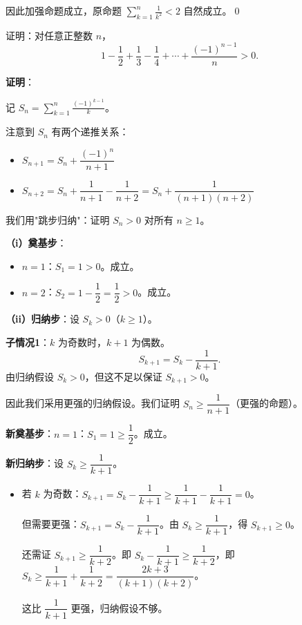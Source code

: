 \documentclass[12pt, a4paper]{ctexart}
\begin{document}
因此加强命题成立，原命题 $\displaystyle\sum_{k=1}^{n}\frac{1}{k^2} < 2$ 自然成立。\qed

\begin{examplebox}[【例题11】跳步归纳法]
证明：对任意正整数 $n$，
\[ 1 - \frac{1}{2} + \frac{1}{3} - \frac{1}{4} + \cdots + \frac{(-1)^{n-1}}{n} > 0. \]
\end{examplebox}

\textbf{证明}：

记 $S_n = \displaystyle\sum_{k=1}^{n}\frac{(-1)^{k-1}}{k}$。

注意到 $S_n$ 有两个递推关系：
\begin{itemize}
  \item $S_{n+1} = S_n + \dfrac{(-1)^n}{n+1}$
  \item $S_{n+2} = S_n + \dfrac{1}{n+1} - \dfrac{1}{n+2} = S_n + \dfrac{1}{(n+1)(n+2)}$
\end{itemize}

我们用"跳步归纳"：证明 $S_n > 0$ 对所有 $n \geq 1$。

\textbf{（i）奠基步}：
\begin{itemize}
  \item $n=1$：$S_1 = 1 > 0$。成立。
  \item $n=2$：$S_2 = 1 - \dfrac{1}{2} = \dfrac{1}{2} > 0$。成立。
\end{itemize}

\textbf{（ii）归纳步}：设 $S_k > 0$（$k \geq 1$）。

\textbf{子情况1}：$k$ 为奇数时，$k+1$ 为偶数。
\[ S_{k+1} = S_k - \frac{1}{k+1}. \]
由归纳假设 $S_k > 0$，但这不足以保证 $S_{k+1} > 0$。

因此我们采用更强的归纳假设。我们证明 $S_n \geq \dfrac{1}{n+1}$（更强的命题）。

\textbf{新奠基步}：$n=1$：$S_1 = 1 \geq \dfrac{1}{2}$。成立。

\textbf{新归纳步}：设 $S_k \geq \dfrac{1}{k+1}$。

\begin{itemize}
  \item 若 $k$ 为奇数：$S_{k+1} = S_k - \dfrac{1}{k+1} \geq \dfrac{1}{k+1} - \dfrac{1}{k+1} = 0$。

  但需要更强：$S_{k+1} = S_k - \dfrac{1}{k+1}$。由 $S_k \geq \dfrac{1}{k+1}$，得 $S_{k+1} \geq 0$。

  还需证 $S_{k+1} \geq \dfrac{1}{k+2}$。即 $S_k - \dfrac{1}{k+1} \geq \dfrac{1}{k+2}$，即 $S_k \geq \dfrac{1}{k+1} + \dfrac{1}{k+2} = \dfrac{2k+3}{(k+1)(k+2)}$。

  这比 $\dfrac{1}{k+1}$ 更强，归纳假设不够。

\end{itemize}
\end{document}
